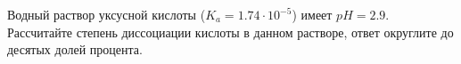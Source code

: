 
Водный раствор уксусной кислоты ($K_a = 1.74 \cdot 10^{-5}$) имеет $pH = 2.9$. 
Рассчитайте степень диссоциации кислоты в данном растворе, ответ округлите до десятых долей процента.


